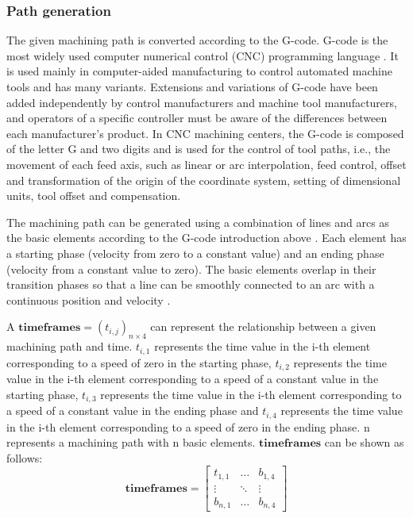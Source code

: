 \subsubsection{Path generation} \label{subsubsec:subsec:sec:scheme:process:path: path generation}
The given machining path is converted according to the G-code. G-code is the most widely used computer numerical control (CNC) programming language \cite{cncs}. It is used mainly in computer-aided manufacturing to control automated machine tools and has many variants. Extensions and variations of G-code have been added independently by control manufacturers and machine tool manufacturers, and operators of a specific controller must be aware of the differences between each manufacturer's product. In CNC machining centers, the G-code is composed of the letter G and two digits and is used for the control of tool paths, i.e., the movement of each feed axis, such as linear or arc interpolation, feed control, offset and transformation of the origin of the coordinate system, setting of dimensional units, tool offset and compensation. \par
The machining path can be generated using a combination of lines and arcs as the basic elements according to the G-code introduction above \cite{dqt}. Each element has a starting phase (velocity from zero to a constant value) and an ending phase (velocity from a constant value to zero). The basic elements overlap in their transition phases so that a line can be smoothly connected to an arc with a continuous position and velocity \cite{dqt}. \par
A $\boldsymbol{timeframes} = (t_{i,j})_{n \times 4}$ can represent the relationship between a given machining path and time. $t_{i,1}$ represents the time value in the i-th element corresponding to a speed of zero in the starting phase, $t_{i,2}$ represents the time value in the i-th element corresponding to a speed of a constant value in the starting phase, $t_{i,3}$ represents the time value in the i-th element corresponding to a speed of a constant value in the ending phase and $t_{i,4}$ represents the time value in the i-th element corresponding to a speed of zero in the ending phase. n represents a machining path with n basic elements. $\boldsymbol{timeframes}$ can be shown as follows:
\begin{equation}
\boldsymbol{timeframes} = \begin{bmatrix} 
    t_{1,1} & \dots  & b_{1,4}\\
    \vdots & \ddots & \vdots\\
    b_{n,1} & \dots  & b_{n,4} 
    \end{bmatrix}
    \label{eq:tframe}
\end{equation}
